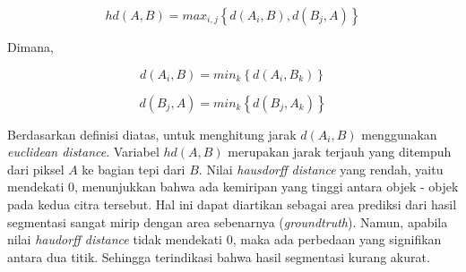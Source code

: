 \begin{equation}
	hd(A,B)=max_{i,j}\left\{d(A_i,B), d(B_j, A)\right\}
	\label{eq13}
\end{equation}

Dimana,

\begin{equation}
	d(A_i,B)=min_{k}\left\{d(A_i,B_k)\right\}
\end{equation}

\begin{equation}
	d(B_j,A)=min_{k}\left\{d(B_j,A_k)\right\}
\end{equation} 

Berdasarkan definisi diatas, untuk menghitung jarak $d(A_i, B)$ menggunakan \textit{euclidean distance}. Variabel $hd(A, B)$ merupakan jarak terjauh yang ditempuh dari piksel $A$ ke bagian tepi dari $B$. Nilai \textit{hausdorff distance} yang rendah, yaitu mendekati 0, menunjukkan bahwa ada kemiripan yang tinggi antara objek - objek pada kedua citra tersebut. Hal ini dapat diartikan sebagai area prediksi dari hasil segmentasi sangat mirip dengan area sebenarnya (\textit{groundtruth}). Namun, apabila nilai \textit{haudorff distance} tidak mendekati 0, maka ada perbedaan yang signifikan antara dua titik. Sehingga terindikasi bahwa hasil segmentasi kurang akurat.





